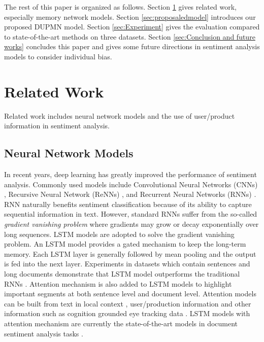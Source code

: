 \documentclass[11pt,a4paper]{article}
\begin{document}
The rest of this paper is organized as follows. Section \ref{sec:Related works} gives related work, especially memory network models. Section \ref{sec:proposaledmodel} introduces our proposed DUPMN model. Section \ref{sec:Experiment} gives the evaluation compared to state-of-the-art methods on three datasets. Section \ref{sec:Conclusion and future works} concludes this paper and gives some future directions in sentiment analysis models to consider individual bias.

\section{Related Work}\label{sec:Related works}
Related work includes neural network models and the use of user/product information in sentiment analysis.

\subsection{Neural Network Models}\label{subsec:neuralmodel} 
In recent years, deep learning has greatly improved the performance of sentiment analysis. Commonly used models include Convolutional Neural Networks (CNNs) \cite{socher2011semi}, Recursive Neural Network (ReNNs) \cite{socher2013recursive}, and Recurrent Neural Networks (RNNs) \cite{irsoy2014opinion}. RNN naturally benefits sentiment classification because of its ability to capture sequential information in text. However, standard RNNs suffer from the so-called \textit{gradient vanishing problem} \cite{bengio1994learning} where gradients may grow or decay exponentially over long sequences. LSTM models are adopted to solve the gradient vanishing problem. An LSTM model provides a gated mechanism to keep the long-term memory. Each LSTM layer is generally followed by mean pooling and the output is fed into the next layer. Experiments in datasets which contain sentences and long documents demonstrate that LSTM model outperforms the traditional RNNs \cite{tang2015document,tang-qin-liu:2015:ACL-IJCNLP}. Attention mechanism is also added to LSTM models to highlight important segments at both sentence level and document level. Attention models can be built from text in local context \cite{yang2016hierarchical}, user/production information \cite{chen2016neural,long2017fake} and other information such as cognition grounded eye tracking data \cite{long2017cognition}. LSTM models with attention mechanism are currently the state-of-the-art models in document sentiment analysis tasks \cite{chen2016neural,long2017cognition}. 
\end{document}
